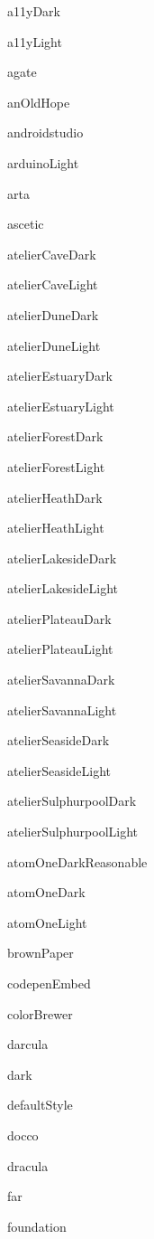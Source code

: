 \begin{DoxyItemize}
\item a11y\+Dark
\item a11y\+Light
\item agate
\item an\+Old\+Hope
\item androidstudio
\item arduino\+Light
\item arta
\item ascetic
\item atelier\+Cave\+Dark
\item atelier\+Cave\+Light
\item atelier\+Dune\+Dark
\item atelier\+Dune\+Light
\item atelier\+Estuary\+Dark
\item atelier\+Estuary\+Light
\item atelier\+Forest\+Dark
\item atelier\+Forest\+Light
\item atelier\+Heath\+Dark
\item atelier\+Heath\+Light
\item atelier\+Lakeside\+Dark
\item atelier\+Lakeside\+Light
\item atelier\+Plateau\+Dark
\item atelier\+Plateau\+Light
\item atelier\+Savanna\+Dark
\item atelier\+Savanna\+Light
\item atelier\+Seaside\+Dark
\item atelier\+Seaside\+Light
\item atelier\+Sulphurpool\+Dark
\item atelier\+Sulphurpool\+Light
\item atom\+One\+Dark\+Reasonable
\item atom\+One\+Dark
\item atom\+One\+Light
\item brown\+Paper
\item codepen\+Embed
\item color\+Brewer
\item darcula
\item dark
\item default\+Style
\item docco
\item dracula
\item far
\item foundation

\end{DoxyItemize}
